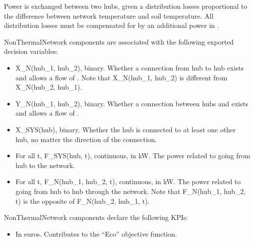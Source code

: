 \documentclass[letterpaper,10pt,english]{sphinxmanual}
\begin{document}
\begin{fulllineitems}
\begin{fulllineitems}
\sphinxAtStartPar
Power is exchanged between two hubs, given a distribution losses proportional to the difference between
network temperature and soil temperature.
All distribution losses must be compensated for by an additional power in .

\sphinxAtStartPar
NonThermalNetwork components are associated with the following exported decision variables:
\begin{itemize}
\item {} 
\sphinxAtStartPar
X\_N(hub\_1, hub\_2), binary.
Whether a connection from hub  to hub  exists and allows a flow of .
Note that X\_N(hub\_1, hub\_2) is different from X\_N(hub\_2, hub\_1).

\item {} 
\sphinxAtStartPar
Y\_N(hub\_1, hub\_2), binary.
Whether a connection between hubs  and  exists and allows a flow of .

\item {} 
\sphinxAtStartPar
X\_SYS(hub), binary.
Whether the hub  is connected to at least one other hub, no matter the direction of the connection.

\item {} 
\sphinxAtStartPar
For all t, F\_SYS(hub, t), continuous, in kW.
The power related to  going from hub  to the network.

\item {} 
\sphinxAtStartPar
For all t, F\_N(hub\_1, hub\_2, t), continuous, in kW.
The power related to  going from hub  to hub  through the network.
Note that F\_N(hub\_1, hub\_2, t) is the opposite of F\_N(hub\_2, hub\_1, t).

\end{itemize}

\sphinxAtStartPar
NonThermalNetwork components declare the following KPIs:
\begin{itemize}
\item {} 
\sphinxAtStartPar
{}
In euros.
Contributes to the “Eco” objective function.


\end{itemize}
\end{fulllineitems}
\end{fulllineitems}
\end{document}
